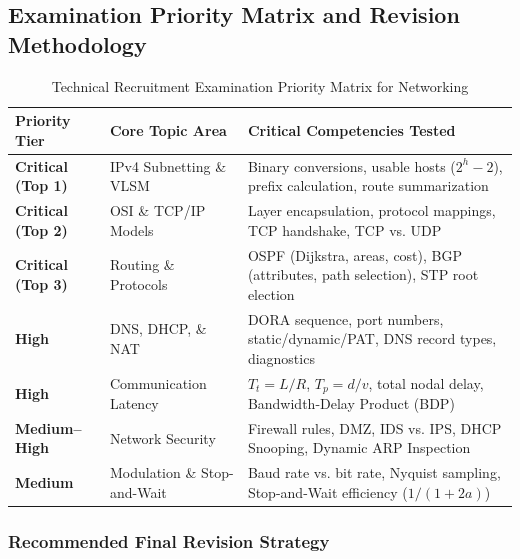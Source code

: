 \subsection{Examination Priority Matrix and Revision Methodology}

\begin{table}[htbp]
\centering
\caption{Technical Recruitment Examination Priority Matrix for Networking}
\label{tab:priority_matrix_networking}
\begin{tabularx}{\textwidth}{p{2.5cm} p{3.8cm} X}
\toprule
\textbf{Priority Tier} & \textbf{Core Topic Area} & \textbf{Critical Competencies Tested} \\
\midrule
\textbf{Critical (Top 1)} & IPv4 Subnetting \& VLSM & Binary conversions, usable hosts ($2^h-2$), prefix calculation, route summarization \\
\textbf{Critical (Top 2)} & OSI \& TCP/IP Models & Layer encapsulation, protocol mappings, TCP handshake, TCP vs. UDP \\
\textbf{Critical (Top 3)} & Routing \& Protocols & OSPF (Dijkstra, areas, cost), BGP (attributes, path selection), STP root election \\
\textbf{High} & DNS, DHCP, \& NAT & DORA sequence, port numbers, static/dynamic/PAT, DNS record types, diagnostics \\
\textbf{High} & Communication Latency & $T_t = L/R$, $T_p = d/v$, total nodal delay, Bandwidth-Delay Product (BDP) \\
\textbf{Medium--High} & Network Security & Firewall rules, DMZ, IDS vs. IPS, DHCP Snooping, Dynamic ARP Inspection \\
\textbf{Medium} & Modulation \& Stop-and-Wait & Baud rate vs. bit rate, Nyquist sampling, Stop-and-Wait efficiency ($1/(1+2a)$) \\
\bottomrule
\end{tabularx}
\end{table}

\subsubsection{Recommended Final Revision Strategy}

